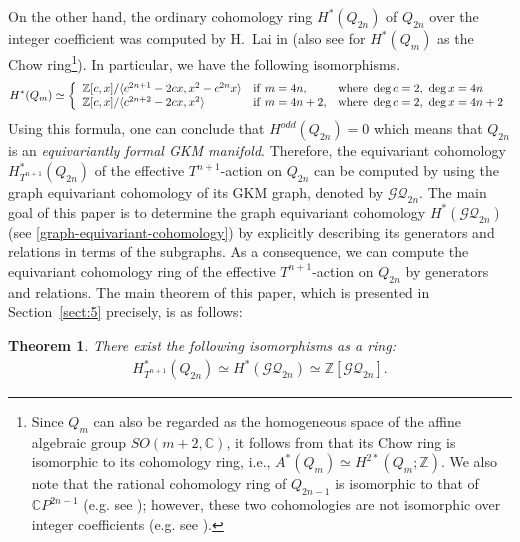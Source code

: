 \documentclass[12pt]{amsart}
\newtheorem{theorem}{Theorem}[section]
\theoremstyle{remark}
\numberwithin{equation}{section}
\begin{document}
On the other hand, the ordinary cohomology ring $H^{*}(Q_{2n})$ of $Q_{2n}$ over the integer coefficient was computed by H.~Lai in \cite{La72, La74} (also see \cite[Excercise 68.3]{EKM08} for $H^{*}(Q_{m})$ as the Chow ring\footnote{Since $Q_{m}$ can also be regarded as the homogeneous space of the affine algebraic group $SO(m+2,\mathbb{C})$, it follows from \cite[Appendix C.3.4]{EH13} that its Chow ring is isomorphic to its cohomology ring, i.e., $A^{*}(Q_{m})\simeq H^{2*}(Q_{m};\mathbb{Z})$. We also note that the rational cohomology ring of $Q_{2n-1}$ is isomorphic to that of $\mathbb{C}P^{2n-1}$ (e.g. see \cite{Uc77}); however, these two cohomologies are not isomorphic over integer coefficients (e.g. see \cite{EKM08, Jo}).}).
In particular, we have the following isomorphisms.
\begin{align}
\label{ordinary-cohom}
H^{*}(Q_{m})\simeq 
\left\{
\begin{array}{lll}
\mathbb{Z}[c,x]/\langle c^{2n+1}-2cx, x^{2}-c^{2n}x \rangle &  {\rm if}\ m=4n, &  {\rm where}\ \deg c=2,\ \deg x=4n \\
\mathbb{Z}[c,x]/\langle c^{2n+2}-2cx, x^{2} \rangle &  {\rm if}\ m=4n+2, &  {\rm where}\ \deg c=2,\ \deg x=4n+2 
\end{array}
\right.
\end{align}
Using this formula, one can conclude that $H^{odd}(Q_{2n})=0$ which means that $Q_{2n}$ is an {\it equivariantly formal GKM manifold}.
Therefore, 
the equivariant cohomology $H_{T^{n+1}}^{*}(Q_{2n})$ of the effective $T^{n+1}$-action on $Q_{2n}$ can be computed by using the graph equivariant cohomology of its GKM graph, denoted by $\mathcal{GQ}_{2n}$.
The main goal of this paper is to determine the graph equivariant cohomology $H^{*}(\mathcal{GQ}_{2n})$ (see \eqref{graph-equivariant-cohomology}) by explicitly describing its generators and relations in terms of the subgraphs. 
As a consequence, we can compute the equivariant cohomology ring of the effective $T^{n+1}$-action on $Q_{2n}$ by generators and relations.
The main theorem of this paper, which is presented in Section~\ref{sect:5} precisely, 
is as follows: 
\begin{theorem}
\label{main}
There exist the following isomorphisms as a ring:
\begin{align*}
H^{*}_{T^{n+1}}(Q_{2n})\simeq H^{*}(\mathcal{GQ}_{2n})\simeq \mathbb{Z}[\mathcal{GQ}_{2n}].
\end{align*} 
\end{theorem}
\end{document}
